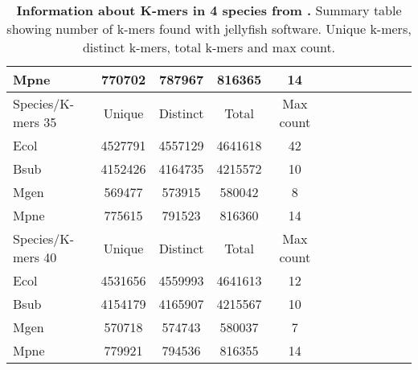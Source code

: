 \begin{table}[!h]
\begin{tabular}{lccccc c ccccc}
Mpne &    770702 &  787967 &     816365 & 14 \\ \hline\hline
Species/K-mers 35      & Unique  & Distinct & Total & Max count \\ \hline\hline
Ecol &    4527791 &  4557129 &     4641618 & 42 \\
Bsub &    4152426 &  4164735 &     4215572 & 10 \\
Mgen &    569477 &  573915 &     580042 & 8 \\
Mpne &    775615 &  791523 &     816360 & 14 \\ \hline\hline
Species/K-mers 40      & Unique  & Distinct & Total & Max count \\ \hline\hline
Ecol &    4531656 &  4559993 &     4641613 & 12 \\
Bsub &    4154179 &  4165907 &     4215567 & 10 \\
Mgen &    570718 &  574743 &     580037 & 7 \\
Mpne &    779921 &  794536 &     816355 & 14 \\ \hline\hline
\end{tabular}

\caption[Information about k-mers in 4 species from \GB.]{%
\label{tbl:genbankgenomesinfo}\textbf{Information about K-mers in 4 species from \GB.} Summary table showing number of k-mers found with jellyfish software. Unique k-mers, distinct k-mers, total k-mers and max count.
}%


\end{table}
